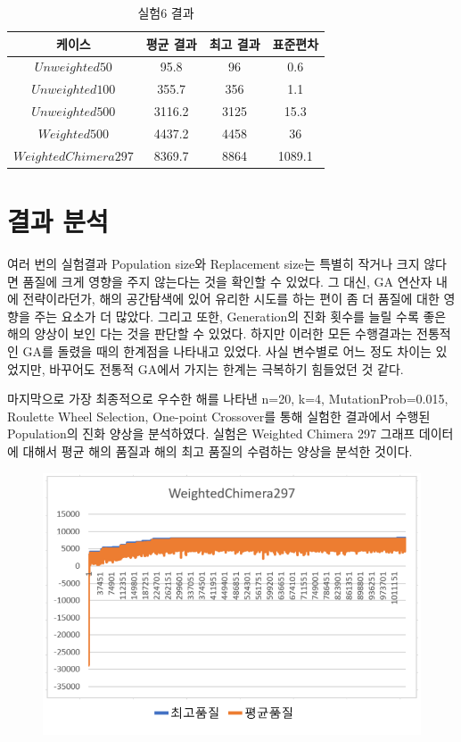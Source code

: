 \documentclass{article}
\begin{document}
 \begin{table}[h]
 \begin{center}
\caption{실험6 결과}
\begin{tabular}{cccc}
\hline\hline
케이스 & 평균 결과 & 최고 결과 & 표준편차\\
\hline\hline
$Unweighted 50$ & 95.8 & 96 & 0.6\\
\hline
$Unweighted 100$ & 355.7 & 356 & 1.1\\
\hline
$Unweighted 500$ & 3116.2 & 3125 & 15.3\\
\hline
$Weighted 500$ & 4437.2 & 4458 & 36\\
\hline
$Weighted Chimera 297$ & 8369.7 & 8864 & 1089.1\\
\hline
\end{tabular}
\end{center}
\end{table}


\section{ 결과 분석 }

여러 번의 실험결과 Population size와 Replacement size는 특별히 작거나 크지 않다면 품질에 크게 영향을 주지 않는다는 것을 확인할 수 있었다. 그 대신, GA 연산자 내에 전략이라던가, 해의 공간탐색에 있어 유리한 시도를 하는 편이 좀 더 품질에 대한 영향을 주는 요소가 더 많았다. 그리고 또한, Generation의 진화 횟수를 늘릴 수록 좋은 해의 양상이 보인 다는 것을 판단할 수 있었다. 하지만 이러한 모든 수행결과는 전통적인 GA를 돌렸을 때의 한계점을 나타내고 있었다. 사실 변수별로 어느 정도 차이는 있었지만, 바꾸어도 전통적 GA에서 가지는 한계는 극복하기 힘들었던 것 같다.

마지막으로 가장 최종적으로 우수한 해를 나타낸 n=20, k=4, MutationProb=0.015, Roulette Wheel Selection, One-point Crossover를 통해 실험한 결과에서 수행된 Population의 진화 양상을 분석하였다. 실험은 Weighted Chimera 297 그래프 데이터에 대해서 평균 해의 품질과 해의 최고 품질의 수렴하는 양상을 분석한 것이다.

\begin{figure}[h]
  \centering
  \includegraphics[width=1.0\textwidth]{chimera_chart.pdf}
  \label{figure1}
\end{figure}
\end{document}
